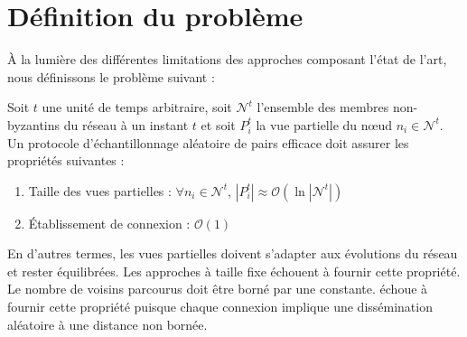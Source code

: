 
\section{Définition du problème}
\label{net:sec:problem}


À la lumière des différentes limitations des approches composant l'état de
l'art, nous définissons le problème suivant :

\begin{problem}
  \label{net:problem:properties}
  Soit $t$ une unité de temps arbitraire, soit $\mathcal{N}^t$ l'ensemble des
  membres non-byzantins du réseau à un instant $t$ et soit $P_i^t$ la vue
  partielle du nœud $n_i \in \mathcal{N}^t$. Un protocole d'échantillonnage
  aléatoire de pairs efficace doit assurer les propriétés suivantes :
  \begin{enumerate}
  \item Taille des vues partielles : \hfill $\forall n_i \in \mathcal{N}^t$,
    $|P_i^t| \approx \mathcal{O}(\ln |\mathcal{N}^t|)$
  \item Établissement de connexion : \hfill $\mathcal{O}(1)$
  \end{enumerate}
\end{problem}
En d'autres termes, les vues partielles doivent s'adapter aux évolutions du
réseau et rester équilibrées. Les approches à taille fixe échouent à fournir
cette propriété.
Le nombre de voisins parcourus doit être borné par une constante. \SCAMP échoue
à fournir cette propriété puisque chaque connexion implique une dissémination
aléatoire à une distance non bornée.

